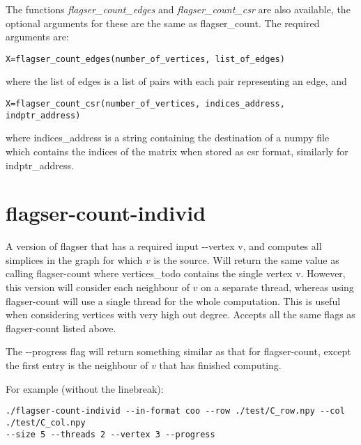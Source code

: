 \documentclass{amsart}
\theoremstyle{definition}
\begin{document}
The functions \textit{flagser\_count\_edges} and \textit{flagser\_count\_csr} are also available, the optional arguments for these are the same as flagser\_count. The required arguments are:
\begin{verbatim}X=flagser_count_edges(number_of_vertices, list_of_edges)\end{verbatim}
where the list of edges is a list of pairs with each pair representing an edge, and
\begin{verbatim}X=flagser_count_csr(number_of_vertices, indices_address, indptr_address)\end{verbatim}
where indices\_address is a string containing the destination of a numpy file which contains the indices of the matrix when stored as csr format, similarly for indptr\_address.

\section{flagser-count-individ}
A version of flagser that has a required input -{}-vertex v, and computes all simplices in the graph for which $v$ is the source. Will return the same value as calling flagser-count where vertices\_todo contains the single vertex v. However, this version will consider each neighbour of $v$ on a separate thread, whereas using flagser-count will use a single thread for the whole computation. This is useful when considering vertices with very high out degree. Accepts all the same flags as flagser-count listed above. 

The -{}-progress flag will return something similar as that for flagser-count, except the first entry is the neighbour of $v$ that has finished computing.

For example (without the linebreak): 
\begin{verbatim}
./flagser-count-individ --in-format coo --row ./test/C_row.npy --col ./test/C_col.npy
--size 5 --threads 2 --vertex 3 --progress
\end{verbatim}
\end{document}
